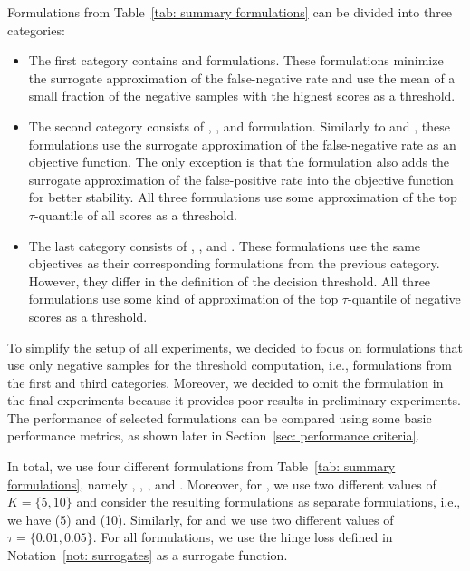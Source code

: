 Formulations from Table~\ref{tab: summary formulations} can be divided into three categories:
\begin{itemize}
  \item The first category contains \TopPush and \TopPushK formulations. These formulations minimize the surrogate approximation of the false-negative rate and use the mean of a small fraction of the negative samples with the highest scores as a threshold.
  \item The second category consists of \Grill, \TopMeanK, and \PatMat formulation. Similarly to \TopPush and \TopPushK, these formulations use the surrogate approximation of the false-negative rate as an objective function. The only exception is that the \Grill formulation also adds the surrogate approximation of the false-positive rate into the objective function for better stability. All three formulations use some approximation of the top $\tau$-quantile of all scores as a threshold.
  \item The last category consists of \GrillNP, \tauFPL, and \PatMatNP. These formulations use the same objectives as their corresponding formulations from the previous category. However, they differ in the definition of the decision threshold. All three formulations use some kind of approximation of the top $\tau$-quantile of negative scores as a threshold.
\end{itemize}
To simplify the setup of all experiments, we decided to focus on formulations that use only negative samples for the threshold computation, i.e., formulations from the first and third categories. Moreover, we decided to omit the \GrillNP formulation in the final experiments because it provides poor results in preliminary experiments. The performance of selected formulations can be compared using some basic performance metrics, as shown later in Section~\ref{sec: performance criteria}.

In total, we use four different formulations from Table~\ref{tab: summary formulations}, namely \TopPush, \TopPushK, \tauFPL, and \PatMatNP. Moreover, for \TopPushK, we use two different values of~$K = \{5, 10\}$ and consider the resulting formulations as separate formulations, i.e., we have \TopPushK(5) and \TopPushK(10). Similarly, for \tauFPL and \PatMat we use two different values of~$\tau = \{0.01, 0.05\}.$ For all formulations, we use the hinge loss defined in Notation~\ref{not: surrogates} as a surrogate function.


